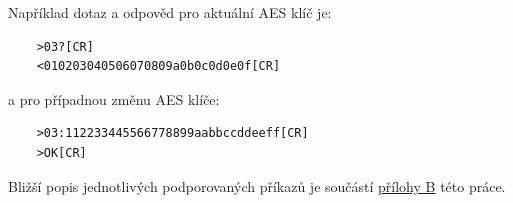 Například dotaz a odpověd pro aktuální AES klíč je:

\begin{verbatim}
	>03?[CR]
	<010203040506070809a0b0c0d0e0f[CR]
\end{verbatim}

a pro případnou změnu AES klíče:

\begin{verbatim}
	>03:112233445566778899aabbccddeeff[CR]
	>OK[CR]
\end{verbatim}


Bližší popis jednotlivých podporovaných příkazů je součástí \hyperlink{prilohaB}{přílohy B} této práce.





